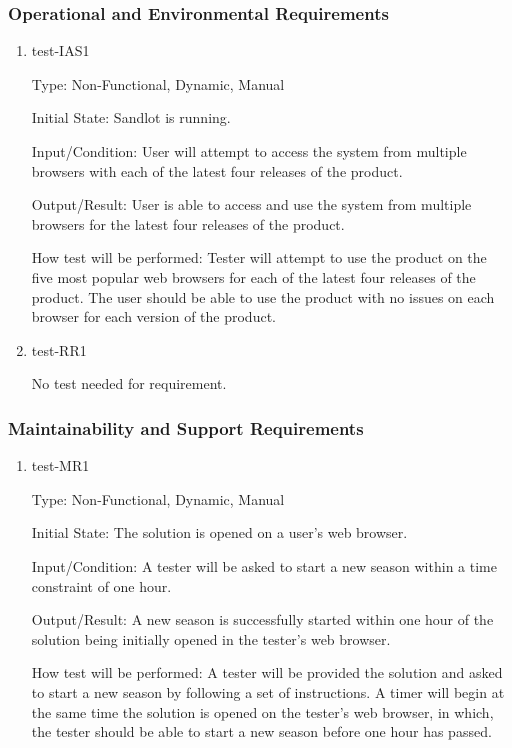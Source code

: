 \documentclass[12pt, titlepage]{article}
\begin{document}
\subsubsection{Operational and Environmental Requirements}

\begin{enumerate}

  \item{test-IAS1\\}

  Type: Non-Functional, Dynamic, Manual

  Initial State: Sandlot is running.

  Input/Condition: User will attempt to access the system from multiple 
  browsers with each of the latest four releases of the product.

  Output/Result: User is able to access and use the system from multiple
  browsers for the latest four releases of the product.

  How test will be performed: Tester will attempt to use the product on
  the five most popular web browsers for each of the latest four 
  releases of the product. The user should be able to use the product
  with no issues on each browser for each version of the product.

  \item{test-RR1\\}

  No test needed for requirement.

\end{enumerate}

\subsubsection{Maintainability and Support Requirements}

\begin{enumerate}

  \item{test-MR1\\}

  Type: Non-Functional, Dynamic, Manual

  Initial State: The solution is opened on a user's web browser.

  Input/Condition: A tester will be asked to start a new season within a time constraint
  of one hour.

  Output/Result: A new season is successfully started within one hour of the solution
  being initially opened in the tester's web browser.

  How test will be performed: A tester will be provided the solution and asked to start
  a new season by following a set of instructions. A timer will begin at the same time
  the solution is opened on the tester's web browser, in which, the tester should be
  able to start a new season before one hour has passed.
  
\end{enumerate}
\end{document}
